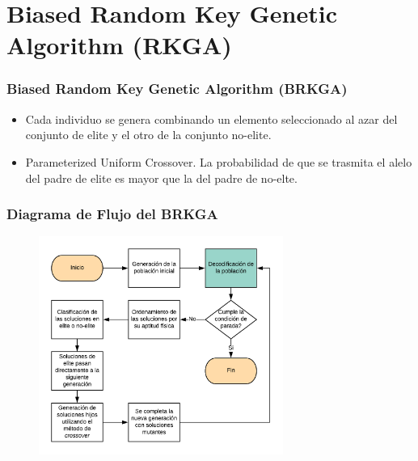 \documentclass{beamer}
\begin{document}

\section{Biased Random Key Genetic Algorithm (RKGA)}

\begin{frame}
\frametitle{Biased Random Key Genetic Algorithm (BRKGA)}

\begin{itemize}
    \item Cada individuo se genera combinando un elemento seleccionado al azar del conjunto de elite y el otro de la conjunto no-elite.
    \pause
    \item Parameterized Uniform Crossover. La probabilidad de que se trasmita el alelo del padre de elite es mayor que la del padre de no-elte.
    \pause
\end{itemize}

\end{frame}


\begin{frame}
\frametitle{Diagrama de Flujo del BRKGA}

\begin{figure}[h]
	\centering
	\includegraphics[width=8cm]{BRKGA_Flow_Chart_Base}
	\label{fig:BRKGA_Flow_Chart_Base}
\end{figure}

\end{frame}

\end{document}

